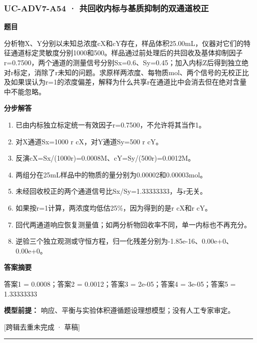 \documentclass[UTF8,11pt,a4paper]{ctexart}
\begin{document}
\subsubsection*{UC-ADV7-A54 · 共回收内标与基质抑制的双通道校正}
\noindent\textbf{题目}\par
分析物X、Y分别以未知总浓度cX和cY存在，样品体积25.00mL，仪器对它们的特征通道标定灵敏度分别1000和500。样品通过前处理后的共回收及基体抑制因子r=0.7500，两个通道的测量信号分别Sx=0.6、Sy=0.45；加入内标Z后得到独立绝对r标定，消除了r未知的问题。求原样两浓度、每物质mol、两个信号的无校正比及如果误认为r=1的浓度偏差，解释为什么共享r在通道比中会消去但在绝对含量中不能忽略。\par
\medskip\noindent\textbf{分步解答}
\begin{enumerate}
\item 已由内标独立标定统一有效因子r=0.7500，不允许将其当作1。
\item 对X通道Sx=1000 r cX，对Y通道Sy=500 r cY。
\item 反演cX=Sx/(1000r)=0.0008M、cY=Sy/(500r)=0.0012M。
\item 两组分在25mL样品中的物质的量分别为0.00002和0.00003mol。
\item 未经回收校正的两个通道信号比Sx/Sy=1.33333333，与r无关。
\item 如果按r=1计算，两浓度均低估25\%，因为得到的是r cX和r cY。
\item 回代两通道响应恢复测量值；如两分析物回收率不同，单一内标也不再充分。
\item 逆验三个独立观测或守恒方程，归一化残差分别为-1.85e-16、0.00e+0、0.00e+0。
\end{enumerate}
\noindent\textbf{答案摘要}\par
答案1 = 0.0008；答案2 = 0.0012；答案3 = 2e-05；答案4 = 3e-05；答案5 = 1.33333333\par
\noindent\textbf{模型前提：}
响应、平衡与实验体积遵循题设理想模型；没有人工专家审定。\par
\noindent\textcolor{red!65!black}{[跨辑去重未完成 · 草稿]} \par
\medskip\hrule\medskip
{}
\end{document}
